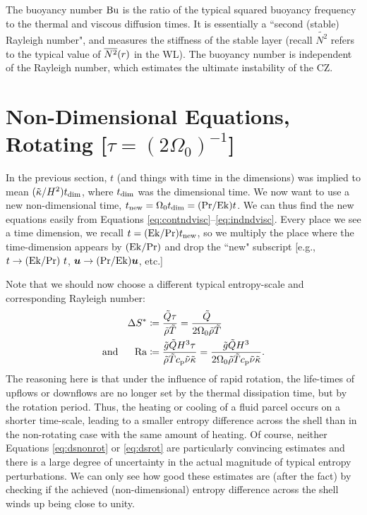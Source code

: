 \documentclass[12pt]{article}
\numberwithin{equation}{section}
\begin{document}
The buoyancy number ${\rm{Bu}}$ is the ratio of the typical squared buoyancy frequency to the thermal and viscous diffusion times. It is essentially a ``second (stable) Rayleigh number", and measures the stiffness of the stable layer (recall $\widetilde{N^2}$ refers to the typical value of $\overline{N^2}(r)$ in the WL). The buoyancy number is independent of the Rayleigh number, which estimates the ultimate instability of the CZ. 

\section{Non-Dimensional Equations, Rotating [$\tau=(2\Omega_0)^{-1}$]}
In the previous section, $t$ (and things with time in the dimensions) was implied to mean $(\tilde{\kappa}/H^2) t_{\rm{dim}}$, where $t_{\rm{dim}}$ was the dimensional time. We now want to use a new non-dimensional time, $t_{\rm{new}}= \Omega_0t_{\rm{dim}} = ({\rm{Pr}}/{\rm{Ek}})t$. We can thus find the new equations easily from Equations \eqref{eq:contndvisc}--\eqref{eq:indndvisc}. Every place we see a time dimension, we recall $t=({\rm{Ek}} /{\rm{Pr}})t_{\rm{new}}$, so we multiply the place where the time-dimension appears by $({\rm{Ek}}/{\rm{Pr}})$ and drop the ``new" subscript [e.g., $t\rightarrow ({\rm{Ek}}/{\rm{Pr}})\ t$, $\bm{u}\rightarrow({\rm{Pr}}/{\rm{Ek}})\bm{u}$, etc.]  

Note that we should now choose a different typical entropy-scale and corresponding Rayleigh number:
\begin{subequations}
	\begin{align}
		\Delta S^*&\coloneqq \frac{\tilde{Q}\tau}{\tilde{\rho}\tilde{T}} = \frac{\tilde{Q}}{2\Omega_0\tilde{\rho}\tilde{T}}\label{eq:dsrot}\\
		\text{and}\ \ \ \ \  {\rm{Ra}} &\coloneqq \frac{\tilde{g} \tilde{Q} H^3\tau}{\tilde{\rho}\tilde{T}c_{\rm{p}}\tilde{\nu} \tilde{\kappa}} =  \frac{\tilde{g} \tilde{Q} H^3}{2\Omega_0\tilde{\rho}\tilde{T}c_{\rm{p}}\tilde{\nu} \tilde{\kappa}}.\label{eq:rarot}
	\end{align}
\end{subequations}
The reasoning here is that under the influence of rapid rotation, the life-times of upflows or downflows are no longer set by the thermal dissipation time, but by the rotation period. Thus, the heating or cooling of a fluid parcel occurs on a shorter time-scale, leading to a smaller entropy difference across the shell than in the non-rotating case with the same amount of heating. Of course, neither Equations \eqref{eq:dsnonrot} or \eqref{eq:dsrot} are particularly convincing estimates and there is a large degree of uncertainty in the actual magnitude of typical entropy perturbations. We can only see how good these estimates are (after the fact) by checking if the achieved (non-dimensional) entropy difference across the shell winds up being close to unity. 
\end{document}
